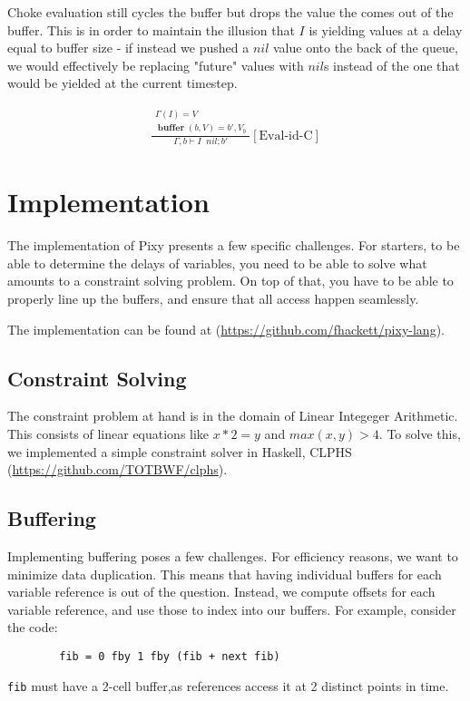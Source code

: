 \documentclass{scrartcl}
\DeclareMathOperator{\ceval}{\overset{C}{\rightarrow}}
\DeclareMathOperator{\buffer}{\mathbf{buffer}}
\begin{document}
    Choke evaluation still cycles the buffer but drops the value the comes out of the buffer. This is in order to maintain the illusion that $I$ is yielding values at a delay equal to buffer size - if instead we pushed a $nil$ value onto the back of the queue, we would effectively be replacing "future" values with $nil$s instead of the one that would be yielded at the current timestep.
    
    \begin{align*}
    \frac{
        \begin{matrix}
        \Gamma(I) = V \\
        \buffer(b, V) = b', V_b
        \end{matrix}
    }{
        \Gamma, b \vdash I \ceval nil; b'
    }[\text{Eval-id-C}]
    \end{align*}
    
    \section{Implementation}
    
    The implementation of Pixy presents a few specific challenges. For starters, 
    to be able to determine the delays of variables, you need to be able to 
    solve what amounts to a constraint solving problem. On top of that, you
    have to be able to properly line up the buffers, and ensure that all access happen seamlessly.

    The implementation can be found at (\url{https://github.com/fhackett/pixy-lang}).

    \subsection{Constraint Solving}
    The constraint problem at hand is in the domain of Linear Integeger Arithmetic. This consists
    of linear equations like $x * 2 = y$ and $max(x,y) > 4$. To solve this, we implemented a 
    simple constraint solver in Haskell, CLPHS (\url{https://github.com/TOTBWF/clphs}).

    \subsection{Buffering}
    Implementing buffering poses a few challenges. For efficiency reasons, we want to minimize data duplication.
    This means that having individual buffers for each variable reference is out of the question. Instead, we compute
    offsets for each variable reference, and use those to index into our buffers. For example, consider the code:
    \begin{lstlisting}
        fib = 0 fby 1 fby (fib + next fib)
    \end{lstlisting}
    \lstinline{fib} must have a 2-cell buffer,as references access it at 2 distinct points in time.
\end{document}

